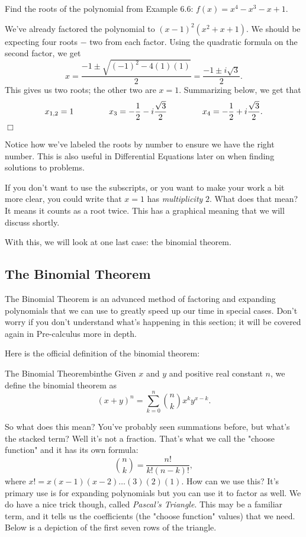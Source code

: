 \documentclass[../book.tex]{subfiles}
\begin{document}
\begin{example}
Find the roots of the polynomial from Example 6.6: $f(x)=x^4-x^3-x+1$.
\end{example}
\begin{solution}
We've already factored the polynomial to $(x-1)^2(x^2+x+1)$.  We should be expecting four roots $-$ two from each factor.  Using the quadratic formula on the second factor, we get $$x=\dfrac{-1\pm\sqrt{(-1)^2-4(1)(1)}}{2}=\dfrac{-1\pm i\sqrt{3}}{2}.$$ This gives us two roots; the other two are $x=1$. Summarizing below, we get that $$x_{1,2}=1 \hspace{15mm} x_3=-\dfrac{1}{2}-i\dfrac{\sqrt{3}}{2} \hspace{15mm} x_4=-\dfrac{1}{2}+i\dfrac{\sqrt{3}}{2}.$$ $\Box$
\end{solution}
\begin{remark}
Notice how we've labeled the roots by number to ensure we have the right number.  This is also useful in Differential Equations later on when finding solutions to problems.
\end{remark}
If you don't want to use the subscripts, or you want to make your work a bit more clear, you could write that $x=1$ has \textit{multiplicity} $2$. What does that mean? It means it counts as a root twice.  This has a graphical meaning that we will discuss shortly.

With this, we will look at one last case: the binomial theorem.
\subsection{The Binomial Theorem}
\noindent The Binomial Theorem is an advanced method of factoring and expanding polynomials that we can use to greatly speed up our time in special cases.  Don't worry if you don't understand what's happening in this section; it will be covered again in Pre-calculus more in depth.

Here is the official definition of the binomial theorem:
\begin{theorem}{The Binomial Theorem}{binthe}
Given $x$ and $y$ and positive real constant $n$, we define the binomial theorem as $$(x+y)^n=\sum_{k=0}^{n}{\binom{n}{k}x^ky^{x-k}}.$$
\end{theorem}
So what does this mean? You've probably seen summations before, but what's the stacked term? Well it's not a fraction.  That's what we call the "choose function" and it has its own formula: $$\binom{n}{k}=\dfrac{n!}{k!(n-k)!},$$ where $x!=x(x-1)(x-2)\ldots(3)(2)(1).$ How can we use this? It's primary use is for expanding polynomials but you can use it to factor as well.  We do have a nice trick though, called \textit{Pascal's Triangle}.  This may be a familiar term, and it tells us the coefficients (the "choose function" values) that we need.  Below is a depiction of the first seven rows of the triangle.
\end{document}
